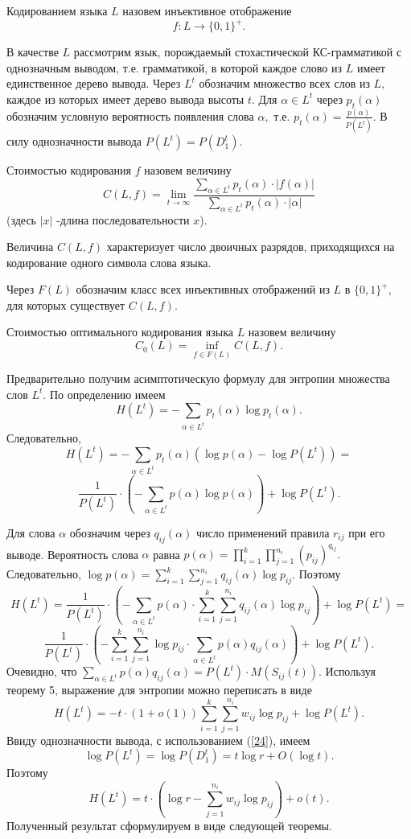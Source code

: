 \documentclass[12pt,russian]{article}
\begin{document}
{Кодированием языка $L$ назовем инъективное отображение
$$
f:  L \rightarrow \{ 0,1 \}^+.
$$

В качестве $L$ рассмотрим язык, порождаемый стохастической КС-грамматикой с однозначным выводом, т.е. грамматикой, в которой каждое слово из $L$ имеет единственное дерево вывода.
Через $L^t$ обозначим множество всех слов из $L,$ каждое из которых имеет дерево вывода высоты $t.$ Для $\alpha \in L^t$ через $p_t(\alpha)$
обозначим условную вероятность появления слова $\alpha,$ т.е.
$p_t(\alpha)=\frac{p(\alpha)}{P(L^t)}.$
В силу однозначности вывода $P(L^t)=P(D^t_1).$

Стоимостью кодирования $f$ назовем величину
\begin{equation}
C(L,f)= \lim_{t \rightarrow \infty}
 \frac {\sum_{ \alpha \in L^t} p_t(\alpha) \cdot
 |f(\alpha)|}
 {\sum_{ \alpha \in L^t} p_t(\alpha) \cdot | \alpha|} 
\label{40}
\end{equation}
(здесь $|x|$ -длина последовательности $x$).

Величина $C(L,f)$ характеризует число двоичных разрядов,
приходящихся на кодирование одного символа слова языка.

Через $F(L)$ обозначим класс всех
инъективных отображений из $L$ в $ \{ 0,1 \}^+,$ для которых
существует $C(L,f).$

Стоимостью оптимального кодирования языка $L$ назовем величину
$$
C_0(L)= \inf_{f \in F(L)} C(L,f).
$$

Предварительно получим асимптотическую формулу для энтропии множества слов $L^t.$ По определению имеем 
$$
H(L^t)=-\sum_{\alpha \in L^t} p_t(\alpha) \log p_t(\alpha).
$$
Следовательно, 
$$
H(L^t)=-\sum_{\alpha \in L^t} p_t(\alpha)\left( \log p(\alpha)-\log P( L^t)\right)=
$$
$$
\frac{1}{P(L^t)}\cdot \left( -\sum_{\alpha \in L^t} p(\alpha) \log p(\alpha) \right)+\log P(L^t).
$$

Для слова $\alpha$ обозначим через $q_{ij}(\alpha)$ число применений правила $r_{ij}$ при его выводе. Вероятность слова $\alpha$ равна
$p(\alpha)=\prod_{i=1}^k \prod_{j=1}^{n_i} (p_{ij})^{q_{ij}}.$ Следовательно, $\log p(\alpha)= \sum_{i=1}^k \sum_{j=1}^{n_i} q_{ij}(\alpha) \log p_{ij}.$ Поэтому 
$$
H(L^t) = \frac{1}{P(L^t)} \cdot \left( -\sum_{\alpha \in L^t} p(\alpha) \cdot \sum_{i=1}^k \sum_{j=1}^{n_i} q_{ij}(\alpha) \log p_{ij} \right)+ \log P(L^t)=
$$
$$
\frac{1}{P(L^t)} \cdot \left( - \sum_{i=1}^k \sum_{j=1}^{n_i} \log p_{ij} \cdot \sum_{\alpha \in L^t} p(\alpha) q_{ij}(\alpha)  \right)+ 
\log P(L^t).
$$
Очевидно, что $\sum_{\alpha \in L^t} p(\alpha) q_{ij}(\alpha) = {P(L^t)}\cdot M(S_{ij}(t)).$
Используя теорему 5, выражение для энтропии можно переписать в виде
$$
H(L^t) = -t\cdot (1+o(1))\sum_{i=1}^k \sum_{j=1}^{n_i} w_{ij}\log p_{ij} + 
\log P(L^t).
$$
Ввиду однозначности вывода, с использованием (\ref{24}), имеем 
$$
\log P(L^t)=\log P(D^t_1)=t \log r+O(\log t).
$$ 
Поэтому 
$$
H(L^t) =t \cdot \left( \log r - \sum_{j=1}^{n_i} w_{ij}\log p_{ij}\right)+o(t).
$$
Полученный результат сформулируем в виде следующей теоремы.

}
\end{document}
